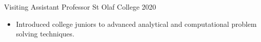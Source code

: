 \documentclass[12pt,letterpaper]{article}
\begin{document}
\begin{itemize}

\end{itemize}

\headerrow
    {Visiting Assistant Professor}
    {St Olaf College}
    {2020}
\begin{itemize}
    \item Introduced college juniors to advanced analytical and computational problem solving techniques.
\end{itemize}
\end{document}
